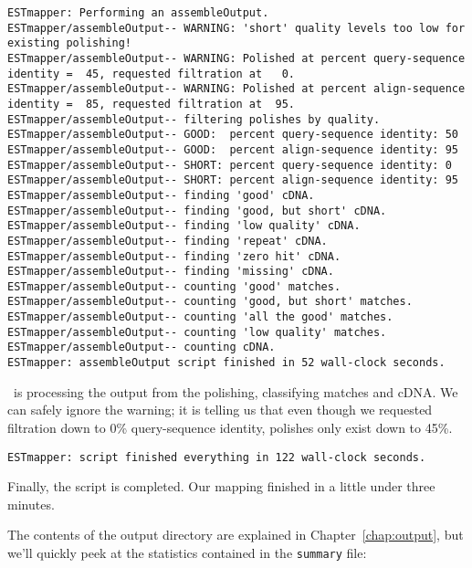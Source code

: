 \documentclass[twoside,11pt]{book}
\begin{document}
\footnotesize
\begin{verbatim}
ESTmapper: Performing an assembleOutput.
ESTmapper/assembleOutput-- WARNING: 'short' quality levels too low for existing polishing!
ESTmapper/assembleOutput-- WARNING: Polished at percent query-sequence identity =  45, requested filtration at   0.
ESTmapper/assembleOutput-- WARNING: Polished at percent align-sequence identity =  85, requested filtration at  95.
ESTmapper/assembleOutput-- filtering polishes by quality.
ESTmapper/assembleOutput-- GOOD:  percent query-sequence identity: 50
ESTmapper/assembleOutput-- GOOD:  percent align-sequence identity: 95
ESTmapper/assembleOutput-- SHORT: percent query-sequence identity: 0
ESTmapper/assembleOutput-- SHORT: percent align-sequence identity: 95
ESTmapper/assembleOutput-- finding 'good' cDNA.
ESTmapper/assembleOutput-- finding 'good, but short' cDNA.
ESTmapper/assembleOutput-- finding 'low quality' cDNA.
ESTmapper/assembleOutput-- finding 'repeat' cDNA.
ESTmapper/assembleOutput-- finding 'zero hit' cDNA.
ESTmapper/assembleOutput-- finding 'missing' cDNA.
ESTmapper/assembleOutput-- counting 'good' matches.
ESTmapper/assembleOutput-- counting 'good, but short' matches.
ESTmapper/assembleOutput-- counting 'all the good' matches.
ESTmapper/assembleOutput-- counting 'low quality' matches.
ESTmapper/assembleOutput-- counting cDNA.
ESTmapper: assembleOutput script finished in 52 wall-clock seconds.
\end{verbatim}
\normalsize

\ESTmapper\ is processing the output from the polishing, classifying
matches and cDNA.  We can safely ignore the warning; it is telling us
that even though we requested filtration down to 0\% query-sequence
identity, polishes only exist down to 45\%.

\footnotesize
\begin{verbatim}
ESTmapper: script finished everything in 122 wall-clock seconds.
\end{verbatim}
\normalsize

Finally, the script is completed.  Our mapping finished in a little
under three minutes.

The contents of the output directory are explained in
Chapter~\ref{chap:output}, but we'll quickly peek at the
statistics contained in the {\tt summary} file:
\end{document}
